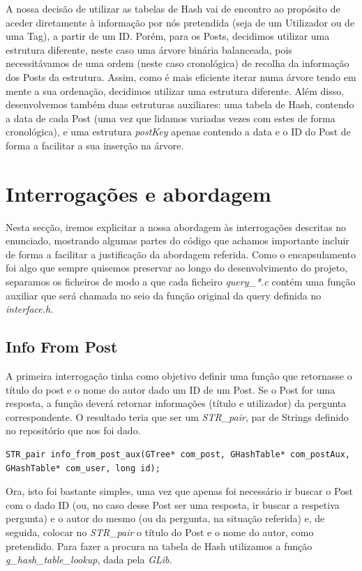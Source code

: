 \documentclass[a4paper, 11pt, oneside]{article}
\begin{document}
A nossa decisão de utilizar as tabelas de Hash vai de encontro ao propósito de aceder diretamente à informação por nós pretendida (seja de um Utilizador ou de uma Tag), a partir de um ID. Porém, para os Posts, decidimos utilizar uma estrutura diferente, neste caso uma árvore binária balanceada, pois necessitávamos de uma ordem (neste caso cronológica) de recolha da informação dos Posts da estrutura. Assim, como é mais eficiente iterar numa árvore tendo em mente a sua ordenação, decidimos utilizar uma estrutura diferente. Além disso, desenvolvemos também duas estruturas auxiliares: uma tabela de Hash, contendo a data de cada Post (uma vez que lidamos variadas vezes com estes de forma cronológica), e uma estrutura \textit{postKey} apenas contendo a data e o ID do Post de forma a facilitar a sua inserção na árvore.

\newpage
\section{Interrogações e abordagem}
\label{queries}
Nesta secção, iremos explicitar a nossa abordagem às interrogações descritas no enunciado, mostrando algumas partes do código que achamos importante incluir de forma a facilitar a justificação da abordagem referida. Como o encapsulamento foi algo que sempre quisemos preservar ao longo do desenvolvimento do projeto, separamos os ficheiros de modo a que cada ficheiro \textit{query\_*.c} contém uma função auxiliar que será chamada no seio da função original da query definida no \textit{interface.h}.

\subsection{Info From Post}
A primeira interrogação tinha como objetivo definir uma função que retornasse o título do post e o nome do autor dado um ID de um Post. Se o Post for uma resposta, a função deverá retornar informações (título e utilizador) da pergunta correspondente. O resultado teria que ser um \textit{STR\_pair}, par de Strings definido no repositório que nos foi dado.

\begin{lstlisting}[caption=Tipo função auxiliar da Query 1]
STR_pair info_from_post_aux(GTree* com_post, GHashTable* com_postAux, GHashTable* com_user, long id);
\end{lstlisting}

Ora, isto foi bastante simples, uma vez que apenas foi necessário ir buscar o Post com o dado ID (ou, no caso desse Post ser uma resposta, ir buscar a respetiva pergunta) e o autor do mesmo (ou da pergunta, na situação referida) e, de seguida, colocar no \textit{STR\_pair} o título do Post e o nome do autor, como pretendido. Para fazer a procura na tabela de Hash utilizamos a função \textit{g\_hash\_table\_lookup}, dada pela \textit{GLib}.
\end{document}
